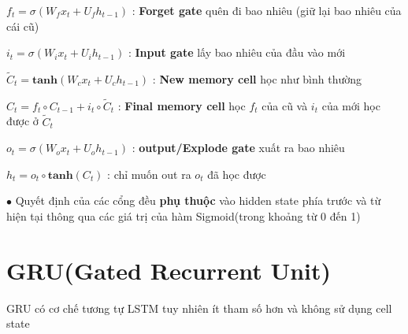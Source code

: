 \documentclass[final,letterpaper,twoside,12pt]{report}
\begin{document}
\begin{center}
\end{center}

$ f_t = \sigma(W_f x_t + U_f h_{t-1})$  :  \textbf{\color{red}Forget gate} quên đi bao nhiêu (giữ lại bao nhiêu của cái cũ)

$i_t = \sigma(W_i x_t + U_i h_{t-1})$  : \textbf{\color{red}Input gate} lấy bao nhiêu của đầu vào mới

$\tilde{C}_t = \mathbf{tanh}(W_c x_t + U_c h_{t-1})$ :  \textbf{\color{red}New memory cell} học như bình thường

$C_t = f_t \circ C_{t-1} + i_t \circ \tilde{C}_t $  : \textbf{\color{red}Final memory cell} học $f_t$ của cũ và $i_t$ của mới học được ở $\tilde{C}_t $

$o_t = \sigma(W_o x_t + U_o h_{t-1})$   : \textbf{\color{red}output/Explode gate} xuất ra bao nhiêu

$h_t = o_t \circ \mathbf{tanh} (C_t)$ : chỉ muốn out ra $o_t$ đã học được

$\bullet$ Quyết định của các cổng đều \textbf{phụ thuộc} vào hidden state phía trước và từ hiện tại thông qua các giá trị của hàm Sigmoid(trong khoảng từ 0 đến 1)
\section{GRU(Gated Recurrent Unit)}

GRU có cơ chế tương tự LSTM tuy nhiên ít tham số hơn và không sử dụng cell state
\end{document}
